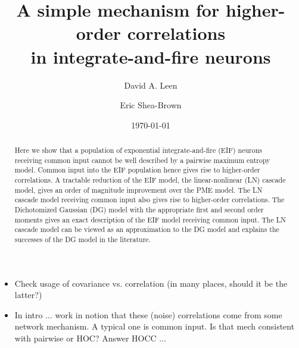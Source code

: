 \documentclass[%
 reprint,
 twocolumn,
 amsmath,amssymb,
 aps,
floatfix,
]{revtex4}
\begin{document}

\title{A simple mechanism for higher-order correlations\\ in integrate-and-fire neurons}%

\author{David A. Leen}

 
\author{Eric Shea-Brown}%

\date{\today}%

\begin{abstract}
Here we show that a population of exponential integrate-and-fire (EIF) neurons receiving common input cannot be well described by a pairwise maximum entropy model. Common input into the EIF population hence gives rise to higher-order correlations. A tractable reduction of the EIF model, the linear-nonlinear (LN) cascade model, gives an order of magnitude improvement over the PME model. The LN cascade model receiving common input also gives rise to higher-order correlations. The Dichotomized Gaussian (DG) model with the appropriate first and second order moments gives an exact description of the EIF model receiving common input. The LN cascade model can be viewed as an approximation to the DG model and explains the successes of the DG model in the literature.
\end{abstract}

\maketitle

\begin{itemize}
\item Check usage of covariance vs. correlation (in many places, should it be the latter?)
\item In intro ... work in notion that these (noise) correlations come from some network mechanism.  A typical one is common input.  Is that mech consistent with pairwise or HOC?  Answer HOCC ... 
\end{itemize}
\end{document}
